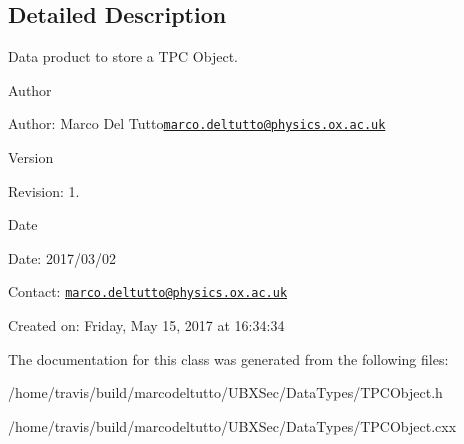 \subsection{Detailed Description}
Data product to store a T\-P\-C Object. 

\begin{DoxyAuthor}{Author}

\end{DoxyAuthor}
\begin{DoxyParagraph}{Author\-:}
Marco Del Tutto\href{mailto:marco.deltutto@physics.ox.ac.uk}{\tt marco.\-deltutto@physics.\-ox.\-ac.\-uk} 
\end{DoxyParagraph}


\begin{DoxyVersion}{Version}

\end{DoxyVersion}
\begin{DoxyParagraph}{Revision\-:}
1. 
\end{DoxyParagraph}


\begin{DoxyDate}{Date}

\end{DoxyDate}
\begin{DoxyParagraph}{Date\-:}
2017/03/02 
\end{DoxyParagraph}


Contact\-: \href{mailto:marco.deltutto@physics.ox.ac.uk}{\tt marco.\-deltutto@physics.\-ox.\-ac.\-uk}

Created on\-: Friday, May 15, 2017 at 16\-:34\-:34 

The documentation for this class was generated from the following files\-:\begin{DoxyCompactItemize}
\item 
/home/travis/build/marcodeltutto/\-U\-B\-X\-Sec/\-Data\-Types/T\-P\-C\-Object.\-h\item 
/home/travis/build/marcodeltutto/\-U\-B\-X\-Sec/\-Data\-Types/T\-P\-C\-Object.\-cxx\end{DoxyCompactItemize}

